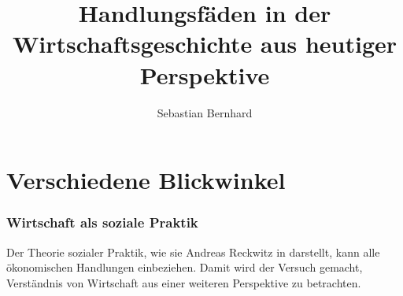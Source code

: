 \documentclass[a4paper]{hitec}
\providecommand\chapter[1]{\section{#1}}
\begin{document}
\author{Sebastian Bernhard}
\title{Handlungsfäden in der Wirtschaftsgeschichte aus heutiger Perspektive}
\maketitle
\tableofcontents

\part{Verschiedene Blickwinkel}

\chapter{Wirtschaft als soziale Praktik}

Der Theorie sozialer Praktik, wie sie Andreas Reckwitz in
\cite{reckwitz2003praktiken} darstellt, kann alle ökonomischen 
Handlungen einbeziehen. Damit wird der Versuch gemacht,
Verständnis von Wirtschaft aus einer weiteren Perspektive
zu betrachten.





















 
\end{document}
